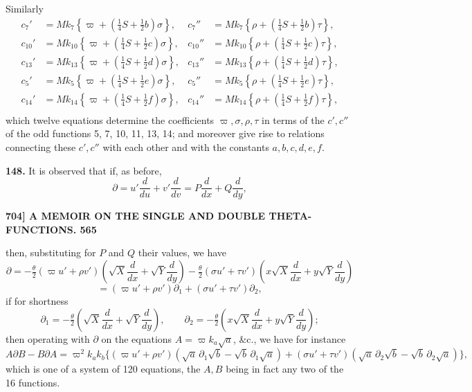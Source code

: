 \documentclass[11pt]{article}
\begin{document}
Similarly
\[
\begin{aligned}
c_7' &= Mk_7\left\{\varpi+\left(\tfrac{1}{4}S+\tfrac{1}{2}b\right)\sigma\right\},&
c_7'' &= Mk_7\left\{\rho+\left(\tfrac{1}{4}S+\tfrac{1}{2}b\right)\tau\right\},\\
c_{10}' &= Mk_{10}\left\{\varpi+\left(\tfrac{1}{4}S+\tfrac{1}{2}c\right)\sigma\right\},&
c_{10}'' &= Mk_{10}\left\{\rho+\left(\tfrac{1}{4}S+\tfrac{1}{2}c\right)\tau\right\},\\
c_{13}' &= Mk_{13}\left\{\varpi+\left(\tfrac{1}{4}S+\tfrac{1}{2}d\right)\sigma\right\},&
c_{13}'' &= Mk_{13}\left\{\rho+\left(\tfrac{1}{4}S+\tfrac{1}{2}d\right)\tau\right\},\\
c_5' &= Mk_5\left\{\varpi+\left(\tfrac{1}{4}S+\tfrac{1}{2}e\right)\sigma\right\},&
c_5'' &= Mk_5\left\{\rho+\left(\tfrac{1}{4}S+\tfrac{1}{2}e\right)\tau\right\},\\
c_{14}' &= Mk_{14}\left\{\varpi+\left(\tfrac{1}{4}S+\tfrac{1}{2}f\right)\sigma\right\},&
c_{14}'' &= Mk_{14}\left\{\rho+\left(\tfrac{1}{4}S+\tfrac{1}{2}f\right)\tau\right\},\\
\end{aligned}
\]
which twelve equations determine the coefficients $\varpi, \sigma, \rho, \tau$ in terms of the $c', c''$ of the odd functions 5, 7, 10, 11, 13, 14; and moreover give rise to relations connecting these $c', c''$ with each other and with the constants $a, b, c, d, e, f$.

\medskip
\textbf{148.} It is observed that if, as before,
\[
\partial = u'\frac{d}{du} + v'\frac{d}{dv} = P\frac{d}{dx} + Q\frac{d}{dy},
\]

\newpage
\noindent\textbf{704] \quad A MEMOIR ON THE SINGLE AND DOUBLE THETA-FUNCTIONS. \hfill 565}

\medskip
then, substituting for $P$ and $Q$ their values, we have
\[
\partial = -\tfrac{\theta}{2}(\varpi u' + \rho v')\!\left(\!\sqrt{X}\frac{d}{dx} + \sqrt{Y}\frac{d}{dy}\!\right) - \tfrac{\theta}{2}(\sigma u' + \tau v')\!\left(\!x\sqrt{X}\frac{d}{dx} + y\sqrt{Y}\frac{d}{dy}\!\right)
\]
\[
= (\varpi u' + \rho v')\partial_1 + (\sigma u' + \tau v')\partial_2,
\]
if for shortness
\[
\partial_1 = -\tfrac{\theta}{2}\!\left(\!\sqrt{X}\frac{d}{dx} + \sqrt{Y}\frac{d}{dy}\!\right),\qquad \partial_2 = -\tfrac{\theta}{2}\!\left(\!x\sqrt{X}\frac{d}{dx} + y\sqrt{Y}\frac{d}{dy}\!\right);
\]
then operating with $\partial$ on the equations $A = \varpi k_a\sqrt{a}$, \&c., we have for instance
\[
A\partial B - B\partial A = \varpi^2 k_a k_b\bigl\{(\varpi u' + \rho v')(\sqrt{a}\,\partial_1\sqrt{b} - \sqrt{b}\,\partial_1\sqrt{a}) + (\sigma u' + \tau v')(\sqrt{a}\,\partial_2\sqrt{b} - \sqrt{b}\,\partial_2\sqrt{a})\bigr\},
\]
which is one of a system of 120 equations, the $A, B$ being in fact any two of the 16 functions.
\end{document}
